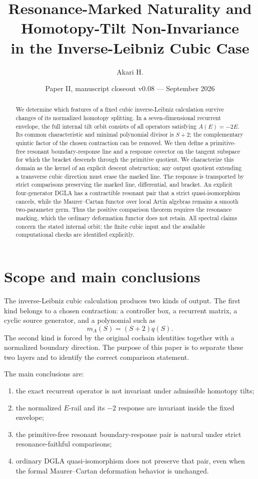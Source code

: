 \documentclass[11pt]{amsart}
\title[Resonance-Marked Naturality]{Resonance-Marked Naturality and Homotopy-Tilt Non-Invariance\\
in the Inverse-Leibniz Cubic Case}
\author{Akari H.}
\date{Paper II, manuscript closeout v0.08 --- September 2026}
\begin{document}
\begin{abstract}
We determine which features of a fixed cubic inverse-Leibniz calculation survive changes
of its normalized homotopy splitting. In a seven-dimensional recurrent envelope,
the full internal tilt orbit consists of all operators satisfying $A(E)=-2E$.
Its common characteristic and minimal polynomial divisor is $S+2$; the complementary
quintic factor of the chosen contraction can be removed. We then define a primitive-free
resonant boundary-response line and a response covector on the tangent subspace for
which the bracket descends through the primitive quotient. We characterize this domain as the kernel of an explicit descent obstruction;
any output quotient extending a transverse cubic direction must erase the marked line. The response is transported by strict comparisons preserving the marked
line, differential, and bracket. An explicit four-generator DGLA has a contractible
resonant pair that a strict quasi-isomorphism cancels, while the Maurer--Cartan functor
over local Artin algebras remains a smooth two-parameter germ. Thus the positive
comparison theorem requires the resonance marking, which the ordinary deformation
functor does not retain. All spectral claims concern the stated internal orbit;
the finite cubic input and the available computational checks are identified explicitly.
\end{abstract}

\maketitle

\section{Scope and main conclusions}

The inverse-Leibniz cubic calculation produces two kinds of output.  The first kind belongs to a chosen contraction: a controller box, a recurrent matrix, a cyclic source generator, and a polynomial such as
\[
m_A(S)=(S+2)q(S).
\]
The second kind is forced by the original cochain identities together with a normalized boundary direction.  The purpose of this paper is to separate these two layers and to identify the correct comparison statement.

The main conclusions are:

\begin{enumerate}[label=(\roman*)]
\item the exact recurrent operator is not invariant under admissible homotopy tilts;
\item the normalized \(E\)-rail and its \(-2\) response are invariant inside the fixed envelope;
\item the primitive-free resonant boundary-response pair is natural under strict resonance-faithful comparisons;
\item ordinary DGLA quasi-isomorphism does not preserve that pair, even when the formal Maurer--Cartan deformation behavior is unchanged.
\end{enumerate}
\end{document}

